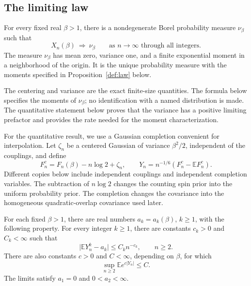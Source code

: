 \subsection{The limiting law}

\begin{theorem}\label{thm:main}
For every fixed real $\beta>1$, there is a nondegenerate Borel probability measure $\nu_\beta$ such that
\[
 X_n(\beta)\ \Longrightarrow\ \nu_\beta
 \qquad\text{as }n\to\infty\text{ through all integers}.
\]
The measure $\nu_\beta$ has mean zero, variance one, and a finite exponential moment in a neighborhood of the origin. It is the unique probability measure with the moments specified in Proposition~\ref{def:law} below.
\end{theorem}

The centering and variance are the exact finite-size quantities. The
formula below specifies the moments of $\nu_\beta$; no identification with a named
distribution is made. The quantitative statement
below proves that the variance has a positive limiting prefactor and
provides the rate needed for the moment characterization.

For the quantitative result, we use a Gaussian completion convenient for interpolation. Let $\zeta_n$ be a centered Gaussian of variance $\beta^2/2$, independent of the couplings, and define
\begin{equation}\label{eq:completed-free-energy}
 F_n^c=F_n(\beta)-n\log2+\zeta_n,
 \qquad Y_n=n^{-1/6}(F_n^c-\mathbb E F_n^c).
\end{equation}
Different copies below include independent couplings and independent completion variables. The subtraction of $n\log2$ changes the counting spin prior into the uniform probability prior. The completion changes the covariance into the homogeneous quadratic-overlap covariance used later.

\begin{theorem}\label{thm:moments}
For each fixed $\beta>1$, there are real numbers $a_k=a_k(\beta)$, $k\ge1$, with the following property. For every integer $k\ge1$, there are constants $c_k>0$ and $C_k<\infty$ such that
\begin{equation}\label{eq:moment-rate}
 \big|\mathbb E Y_n^k-a_k\big|\le C_k n^{-c_k},\qquad n\ge2.
\end{equation}
There are also constants $c>0$ and $C<\infty$, depending on $\beta$, for which
\begin{equation}\label{eq:exponential-moments}
 \sup_{n\ge2}\mathbb E e^{c|Y_n|}\le C.
\end{equation}
The limits satisfy $a_1=0$ and $0<a_2<\infty$.
\end{theorem}

